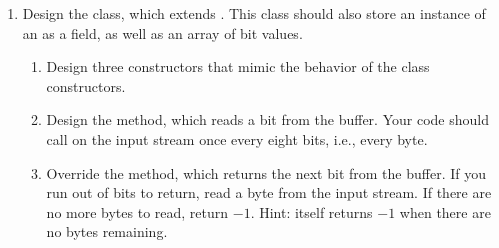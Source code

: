 \begin{enumerate}[label=(\alph*)]
    \item Design the  class, which extends . This class should also store an instance of an  as a field, as well as an array of bit values.
    \begin{enumerate}[label=(\roman*)]
        \item Design three  constructors that mimic the behavior of the  class constructors.
        \item Design the  method, which reads a bit from the buffer. Your code should call  on the input stream once every eight bits, i.e., every byte. 
        \item Override the  method, which returns the next bit from the buffer. If you run out of bits to return, read a byte from the input stream. If there are no more bytes to read, return $-1$. Hint:  itself returns $-1$ when there are no bytes remaining.
    \end{enumerate}
\end{enumerate}

\newpage %

